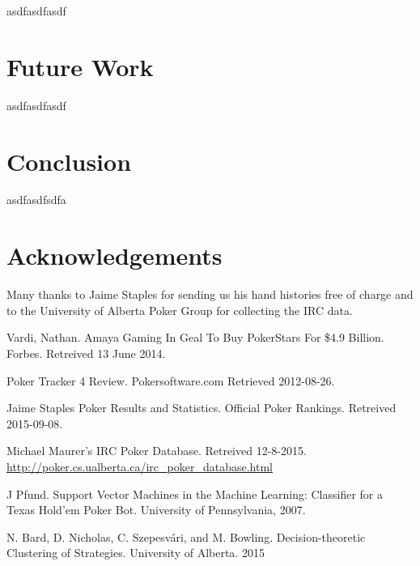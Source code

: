\documentclass[twoside]{article}
\begin{document}
\begin{multicols}{2}
asdfasdfasdf


\section{Future Work}

asdfasdfasdf


\section{Conclusion}

asdfasdfsdfa


\section{Acknowledgements}

Many thanks to Jaime Staples for sending us his hand histories free of charge and to the University of Alberta Poker Group for collecting the IRC data. 



\begin{thebibliography}{99} %

 Vardi, Nathan. Amaya Gaming In Geal To Buy PokerStars For \$4.9 Billion. Forbes. Retreived 13 June 2014. 

 Poker Tracker 4 Review. Pokersoftware.com Retrieved 2012-08-26.

 Jaime Staples Poker Results and Statistics. Official Poker Rankings. Retreived 2015-09-08.

 Michael Maurer's IRC Poker Database. Retreived 12-8-2015.
\url{http://poker.cs.ualberta.ca/irc_poker_database.html}

 J Pfund. Support Vector Machines in the Machine Learning: Classifier for a Texas Hold'em Poker Bot.  University of Pennsylvania, 2007.

 N. Bard, D. Nicholas, C. Szepesvári, and M. Bowling. Decision-theoretic Clustering of Strategies. University of Alberta. 2015


\end{thebibliography}
\end{multicols}
\end{document}
